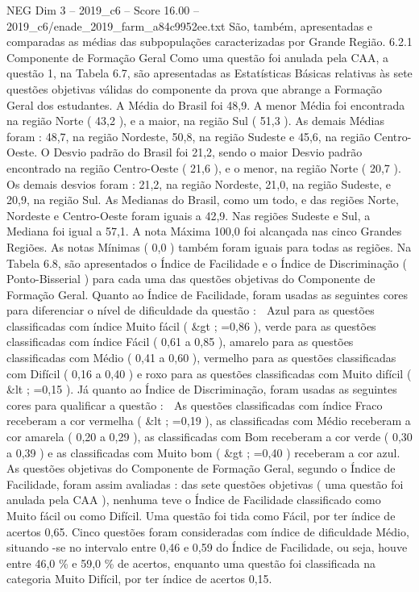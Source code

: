 \begin{textsample}{NEG Dim 3 – 2019\_c6 – Score 16.00 – 2019\_c6/enade\_2019\_farm\_a84c9952ee.txt}
São, também, apresentadas e comparadas as médias das subpopulações caracterizadas por Grande Região. 6.2.1 Componente de Formação Geral Como uma questão foi anulada pela CAA, a questão 1, na Tabela 6.7, são apresentadas as Estatísticas Básicas relativas às sete questões objetivas válidas do componente da prova que abrange a Formação Geral dos estudantes.
A Média do Brasil foi 48,9.
A menor Média foi encontrada na região Norte ( 43,2 ), e a maior, na região Sul ( 51,3 ).
As demais Médias foram : 48,7, na região Nordeste, 50,8, na região Sudeste e 45,6, na região Centro-Oeste.
O Desvio padrão do Brasil foi 21,2, sendo o maior Desvio padrão encontrado na região Centro-Oeste ( 21,6 ), e o menor, na região Norte ( 20,7 ).
Os demais desvios foram : 21,2, na região Nordeste, 21,0, na região Sudeste, e 20,9, na região Sul.
As Medianas do Brasil, como um todo, e das regiões Norte, Nordeste e Centro-Oeste foram iguais a 42,9.
Nas regiões Sudeste e Sul, a Mediana foi igual a 57,1.
A nota Máxima 100,0 foi alcançada nas cinco Grandes Regiões.
As notas Mínimas ( 0,0 ) também foram iguais para todas as regiões.
Na Tabela 6.8, são apresentados o Índice de Facilidade e o Índice de Discriminação ( Ponto-Bisserial ) para cada uma das questões objetivas do Componente de Formação Geral.
Quanto ao Índice de Facilidade, foram usadas as seguintes cores para diferenciar o nível de dificuldade da questão :  Azul para as questões classificadas com índice Muito fácil ( \&gt ; =0,86 ), verde para as questões classificadas com índice Fácil ( 0,61 a 0,85 ), amarelo para as questões classificadas com Médio ( 0,41 a 0,60 ), vermelho para as questões classificadas com Difícil ( 0,16 a 0,40 ) e roxo para as questões classificadas com Muito difícil ( \&lt ; =0,15 ).
Já quanto ao Índice de Discriminação, foram usadas as seguintes cores para qualificar a questão :  As questões classificadas com índice Fraco receberam a cor vermelha ( \&lt ; =0,19 ), as classificadas com Médio receberam a cor amarela ( 0,20 a 0,29 ), as classificadas com Bom receberam a cor verde ( 0,30 a 0,39 ) e as classificadas com Muito bom ( \&gt ; =0,40 ) receberam a cor azul.
As questões objetivas do Componente de Formação Geral, segundo o Índice de Facilidade, foram assim avaliadas : das sete questões objetivas ( uma questão foi anulada pela CAA ), nenhuma teve o Índice de Facilidade classificado como Muito fácil ou como Difícil.
Uma questão foi tida como Fácil, por ter índice de acertos 0,65.
Cinco questões foram consideradas com índice de dificuldade Médio, situando -se no intervalo entre 0,46 e 0,59 do Índice de Facilidade, ou seja, houve entre 46,0 \% e 59,0 \% de acertos, enquanto uma questão foi classificada na categoria Muito Difícil, por ter índice de acertos 0,15.

\end{textsample}
